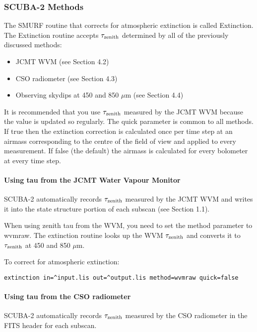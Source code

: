 \documentclass[twoside,11pt]{article}
\renewcommand{\_}{\texttt{\symbol{95}}}
\begin{document}
\subsubsection{SCUBA-2 Methods}

The SMURF routine that corrects for atmospheric extinction is called
Extinction.  The Extinction routine accepts $\tau_{\rm zenith}$
determined by all of the previously discussed methods:
\begin{itemize}
\item JCMT WVM (see Section 4.2)
\item CSO radiometer (see Section 4.3)
\item Observing skydips at 450 and 850 $\mu$m (see Section 4.4)
\end{itemize}

It is recommended that you use $\tau_{\rm zenith}$ measured by the
JCMT WVM because the value is updated so regularly. The quick
parameter is common to all methods. If true then the extinction
correction is calculated once per time step at an airmass
corresponding to the centre of the field of view and applied to every
measurement. If false (the default) the airmass is calculated for
every bolometer at every time step. 

\paragraph{Using tau from the JCMT Water Vapour Monitor}

SCUBA-2 automatically records $\tau_{\rm zenith}$ measured by the JCMT
WVM and writes it into the state structure portion of each subscan
(see Section 1.1).

When using zenith tau from the WVM, you need to set the method
parameter to wvmraw. The extinction routine looks up the WVM
$\tau_{\rm zenith}$ and converts it to $\tau_{\rm zenith}$ at 450 and
850 $\mu$m.

To correct for atmospheric extinction:
\begin{verbatim}
extinction in=^input.lis out=^output.lis method=wvmraw quick=false
\end{verbatim}

\paragraph{Using tau from the CSO radiometer}

SCUBA-2 automatically records $\tau_{\rm zenith}$ measured by the CSO
radiometer in the FITS header for each subscan.
\end{document}
